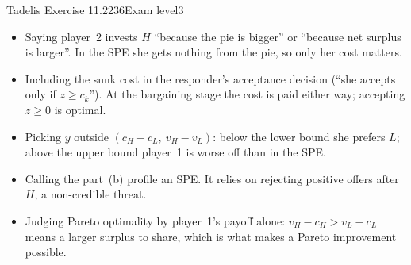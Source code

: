\begin{exsol}{Tadelis Exercise 11.2}{236}{Exam level}{3}
\mistakes
\begin{itemize}
  \item Saying player~2 invests $H$ ``because the pie is bigger'' or ``because net surplus is larger''.
  In the SPE she gets nothing from the pie, so only her cost matters.
  \item Including the sunk cost in the responder's acceptance decision (``she accepts only if $z \ge
  c_k$''). At the bargaining stage the cost is paid either way; accepting $z \ge 0$ is optimal.
  \item Picking $y$ outside $(c_H - c_L,\ v_H - v_L)$: below the lower bound she prefers $L$; above the
  upper bound player~1 is worse off than in the SPE.
  \item Calling the part~(b) profile an SPE. It relies on rejecting positive offers after $H$, a
  non-credible threat.
  \item Judging Pareto optimality by player~1's payoff alone: $v_H - c_H > v_L - c_L$ means a larger
  surplus to share, which is what makes a Pareto improvement possible.
\end{itemize}

\end{exsol}
